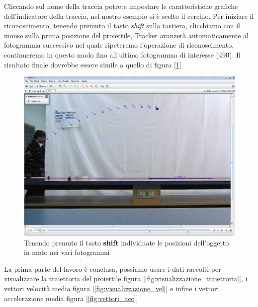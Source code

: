 \documentclass[a4paper,10pt,oneside]{article}
\begin{document}
Cliccando sul nome della traccia potrete impostare le caratteristiche grafiche dell'indicatore della traccia, nel nostro esempio si è scelto il cerchio. Per iniziare il riconoscimento, tenendo premuto il tasto \textsl{shift} sulla tastiera, clicchiamo con il mouse sulla prima posizione del proiettile, Tracker avanzerà automaticamente  al fotogramma successivo nel quale ripeteremo l'operazione di riconoscimento, continueremo in questo modo fino all'ultimo fotogramma di interesse (490). Il risultato finale dovrebbe essere simile a quello di figura [\ref{fig:posizioni_massi}]

\begin{figure}[H]
 \centering
 \includegraphics[width=\textwidth]{./immagini/tracker_posizioni_massa.png}
 \caption{Tenendo premuto il tasto \textbf{shift} individuate le posizioni dell'oggetto in moto nei vari fotogrammi}
 \label{fig:posizioni_massi}
\end{figure}

La prima parte del lavoro è conclusa, possiamo usare i dati raccolti per visualizzare la traiettoria del proiettile figura [\ref{fig:visualizzazione_traiettoria}], i vettori velocità media figura [\ref{fig:visualizzazione_vel}] e infine i vettori accelerazione media figura [\ref{fig:vettori_acc}]
\end{document}
